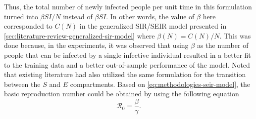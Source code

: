 Thus, the total number of newly infected people per unit time in this formulation turned into $\beta SI / N$ instead of $\beta SI$.
In other words, the value of $\beta$ here corresponded to $C(N)$ in the generalized \gls{SIR}/\gls{SEIR} model presented in \autoref{sec:literature-review-generalized-sir-model} where $\beta(N) = C(N) / N$.
This was done because, in the experiments, it was observed that using $\beta$ as the number of people that can be infected by a single infective individual resulted in a better fit to the training data and a better out-of-sample performance of the model.
Noted that existing literature \cite{arikInterpretableSequenceLearning, bastosModelingForecastingEarly2020,dengDynamicsDevelopmentCOVID192020, heSEIRModelingCOVID192020,ihmecovid-19forecastingteamModelingCOVID19Scenarios2021, ndairouMathematicalModelingCOVID192020,sarkarModelingForecastingCOVID192020, zhaoModelingEpidemicDynamics2020} had also utilized the same formulation for the transition between the $S$ and $E$ compartments.
Based on \autoref{eq:methodologies-seir-model}, the basic reproduction number could be obtained by using the following equation
\begin{equation*}
    \mathcal{R}_0 = \frac{\beta}{\gamma}.
    \label{eq:methodologies-seir-reproduction-number}
\end{equation*}

